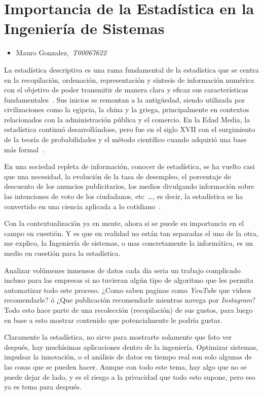 \documentclass[letterpaper, 12pt]{report}
\begin{document}
\chapter*{Importancia de la Estadística en la Ingeniería de Sistemas}

\noindent\makebox[\linewidth]{\rule{\textwidth}{0.2pt}}

\begin{itemize}
      \item Mauro Gonzalez,~\textit{T00067622}
\end{itemize}

\noindent\makebox[\linewidth]{\rule{\textwidth}{0.2pt}}

La estadística descriptiva es una rama fundamental de la
estadística que se centra en la recopilación, ordenación,
representación y síntesis de información numérica con el
objetivo de poder transmitir de manera clara y eficaz sus
características fundamentales~\cite{Rodríguez_2023}. Sus
inicios se remontan a la antigüedad, siendo utilizada por
civilizaciones como la egipcia, la china y la griega,
principalmente en contextos relacionados con la
administración pública y el comercio. En la Edad Media, la
estadística continuó desarrollándose, pero fue en el siglo
XVII con el surgimiento de la teoría de probabilidades y el
método científico cuando adquirió una base más
formal~\cite{MonicaGhilardi}.

En una sociedad repleta de información, conocer de
estadística, se ha vuelto casi que una necesidad, la
evolución de la tasa de desempleo, el porcentaje de
descuento de los anuncios publicitarios, los medios
divulgando información sobre las intenciones de voto de los
ciudadanos, etc~\dots, es decir, la estadística se ha
convertido en una ciencia aplicada a lo cotidiano~\cite{Rodríguez_2023b}.

Con la contextualización ya en mente, ahora si se puede su
importancia en el campo en cuestión. Y es que en realidad
no están tan separadas el uno de la otra, me explico, la
Ingeniería de sistemas, o mas concretamente la informática,
es un medio en cuestión para la estadística.

Analizar volúmenes inmensos de datos cada dia seria un
trabajo complicado incluso para las empresas si no tuvieran
algún tipo de algoritmo que les permita automatizar todo
este proceso. ¿Como saben paginas como \textit{YouTube} que
videos recomendarle? ó ¿Que publicación recomendarle
mientras navega por \textit{Instagram}? Todo esto hace
parte de una recolección (recopilación) de sus gustos, para
luego en base a esto mostrar contenido que potencialmente
le podría gustar.

Claramente la estadística, no sirve para mostrarte
solamente que foto ver después, hay muchísimas aplicaciones
dentro de la ingeniería. Optimizar sistemas, impulsar la
innovación, o el análisis de datos en tiempo real son solo
algunas de las cosas que se pueden hacer. Aunque con todo
este tema, hay algo que no se puede dejar de lado, y es el
riesgo a la privacidad que todo esto supone, pero eso ya es
tema para después.

\nocite{Jeanluc_2023}
\nocite{Cutipa_2023}

\printbibliography
\end{document}
